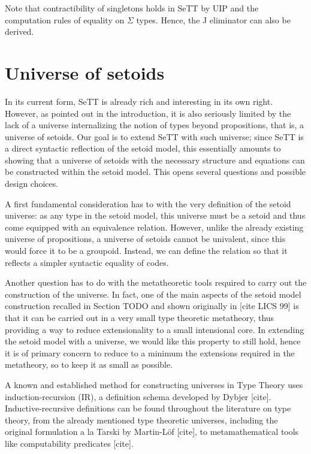 \documentclass{easychair}
\begin{document}
Note that contractibility of singletons holds in SeTT by UIP and the computation
rules of equality on $\Sigma$ types. Hence, the J eliminator can also be
derived.

\section{Universe of setoids}

In its current form, SeTT is already rich and interesting in its own right.
However, as pointed out in the introduction, it is also seriously limited by the
lack of a universe internalizing the notion of types beyond propositions, that
is, a universe of setoids. Our goal is to extend SeTT with such universe; since
SeTT is a direct syntactic reflection of the setoid model, this essentially
amounts to showing that a universe of setoids with the necessary structure and
equations can be constructed within the setoid model. This opens several
questions and possible design choices.

A first fundamental consideration has to with the very definition of the setoid
universe: as any type in the setoid model, this universe must be a setoid and
thus come equipped with an equivalence relation. However, unlike the already
existing universe of propositions, a universe of setoids cannot be univalent,
since this would force it to be a groupoid. Instead, we can define the relation
so that it reflects a simpler syntactic equality of codes.

Another question has to do with the metatheoretic tools required to carry out
the construction of the universe. In fact, one of the main aspects of the setoid
model construction recalled in Section TODO and shown originally in [cite LICS
  99] is that it can be carried out in a very small type theoretic metatheory,
thus providing a way to reduce extensionality to a small intensional core.
%
In extending the setoid model with a universe, we would like this property to
still hold, hence it is of primary concern to reduce to a minimum the extensions
required in the metatheory, so to keep it as small as possible.

A known and established method for constructing universes in Type Theory uses
induction-recursion (IR), a definition schema developed by Dybjer
[cite]. Inductive-recursive definitions can be found throughout the literature
on type theory, from the already mentioned type theoretic universes, including
the original formulation a la Tarski by Martin-L\"of [cite], to metamathematical
tools like computability predicates [cite].
\end{document}
